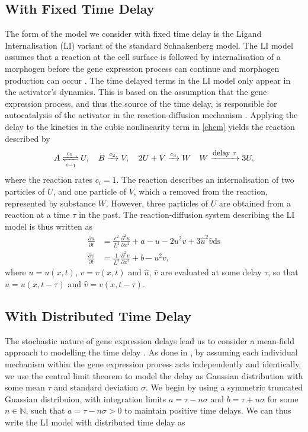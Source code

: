 \subsection{With Fixed Time Delay}

The form of the model we consider with fixed time delay is the Ligand Internalisation (LI) variant of the standard Schnakenberg model. The LI model assumes that a reaction at the cell surface is followed by internalisation of a morphogen before the gene expression process can continue and morphogen production can occur \cite{leegaffney,yigaffneyli}. The time delayed terms in the LI model only appear in the activator's dynamics. This is based on the assumption that the gene expression process, and thus the source of the time delay, is responsible for autocatalysis of the activator in the reaction-diffusion mechanism \cite{gaffmonk}. Applying the delay to the kinetics in the cubic nonlinearity term \cite{baker} in \eqref{chem} yields the reaction described by
\begin{equation}\label{chem2}
A\xrightleftharpoons[c_{-1}]{c_1} U,\quad B\xrightarrow{c_2} V,\quad 2U+V\xrightarrow{c_3} W\quad W\xrightarrow{\text{\footnotesize delay } \tau}3U,
\end{equation}
where the reaction rates $c_i=1$. The reaction describes an internalisation of two particles of $U$, and one particle of $V$, which a removed from the reaction, represented by substance $W$. However, three particles of $U$ are obtained from a reaction at a time $\tau$ in the past. The reaction-diffusion system describing the LI model is thus written as \cite{leegaffney}
\begin{equation}\label{fixed}
  \begin{split}
  \frac{\partial u}{\partial t}&=\frac{\epsilon^2}{L^2}\frac{\partial^2u}{\partial x^2}+a-u-2u^2v+3\hat{u}^2\hat{v} \text{ds}\\
  \frac{\partial v}{\partial t}&=\frac{1}{L^2}\frac{\partial^2v}{\partial x^2}+b-u^2v,
\end{split}
\end{equation}
where $u=u(x,t)$, $v=v(x,t)$ and $\hat{u}$, $\hat{v}$ are evaluated at some delay $\tau$, so that $\hat{u}=u(x,t-\tau)$ and $\hat{v}=v(x,t-\tau)$.

\subsection{With Distributed Time Delay}

The stochastic nature of gene expression delays lead us to consider a mean-field approach to modelling the time delay \cite{bratsun,krausenew}. As done in \cite{william}, by assuming each individual mechanism within the gene expression process acts independently and identically, we use the central limit theorem to model the delay as Gaussian distribution with some mean $\tau$ and standard deviation $\sigma$. We begin by using a symmetric truncated Guassian distribuion, with integration limits $a=\tau-n\sigma$ and $b=\tau+n\sigma$ for some $n\in\mathbb{N}$, such that $a=\tau-n\sigma>0$ to maintain positive time delays. We can thus write the LI model with distributed time delay as

